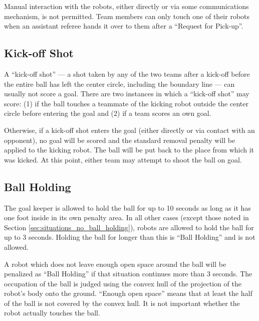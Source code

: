 \documentclass[12pt]{article}
\begin{document}
Manual interaction with the robots, either directly or via some communications mechanism, is not permitted. Team members can only touch one of their robots when an assistant referee hands it over to them after a ``Request for Pick-up''.

\subsection{Kick-off Shot}
\label{sec:kick-off_shot}

A ``kick-off shot'' --- a shot taken by any of the two teams after a kick-off before the entire ball has left the center circle, including the boundary line --- can usually not score a goal. There are two instances in which a ``kick-off shot'' may score: (1) if the ball touches a teammate of the kicking robot outside the center circle before entering the goal and (2) if a team scores an own goal.
 
Otherwise, if a kick-off shot enters the goal (either directly or via contact with an opponent), no goal will be scored and the standard removal penalty will be applied to the kicking robot. The ball will be put back to the place from which it was kicked. At this point, either team may attempt to shoot the ball on goal.


\subsection{Ball Holding}
\label{sec:ball_holding}

The goal keeper is allowed to hold the ball for up to 10 seconds as long as it has one foot inside in its own penalty area.  In all other cases (except those noted in Section \ref{sec:situations_no_ball_holding}), robots are allowed to hold the ball for up to 3 seconds. Holding the ball for longer than this is ``Ball Holding'' and is not allowed.

A robot which does not leave enough open space around the ball will be penalized as ``Ball Holding'' if that situation continues more than 3 seconds. The occupation of the ball is judged using the convex hull of the projection of the robot's body onto the ground. ``Enough open space'' means that at least the half of the ball is not covered by the convex hull. It is not important whether the robot actually touches the ball.
\end{document}

